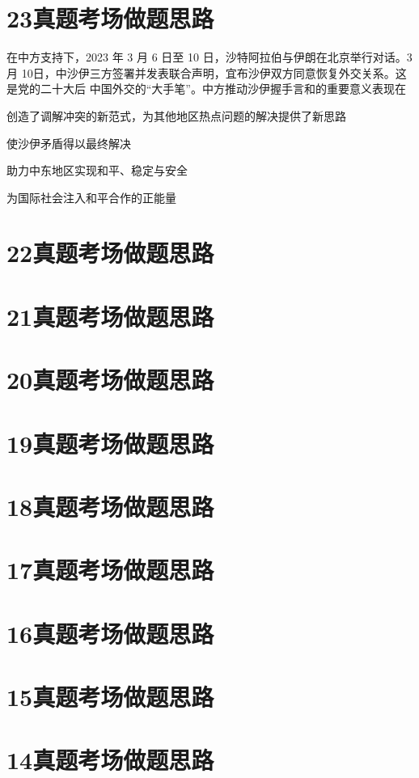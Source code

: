 \documentclass[lang=cn,newtx,10pt,scheme=chinese,pad,twocol]{zznote}
\begin{document}
\section{23真题考场做题思路}
\begin{exercise}在中方支持下，2023 年 3 月 6 日至 10 日，沙特阿拉伯与伊朗在北京举行对话。3 月 10日，中沙伊三方签署并发表联合声明，宜布沙伊双方同意恢复外交关系。这是党的二十大后 中国外交的“大手笔”。中方推动沙伊握手言和的重要意义表现在
	\begin{choice}
		\item 创造了调解冲突的新范式，为其他地区热点问题的解决提供了新思路
		\item 使沙伊矛盾得以最终解决
		\item 助力中东地区实现和平、稳定与安全
		\item 为国际社会注入和平合作的正能量
	\end{choice}
\end{exercise}
\section{22真题考场做题思路}
\section{21真题考场做题思路}
\section{20真题考场做题思路}
\section{19真题考场做题思路}
\section{18真题考场做题思路}
\section{17真题考场做题思路}
\section{16真题考场做题思路}
\section{15真题考场做题思路}
\section{14真题考场做题思路}
\end{document}
